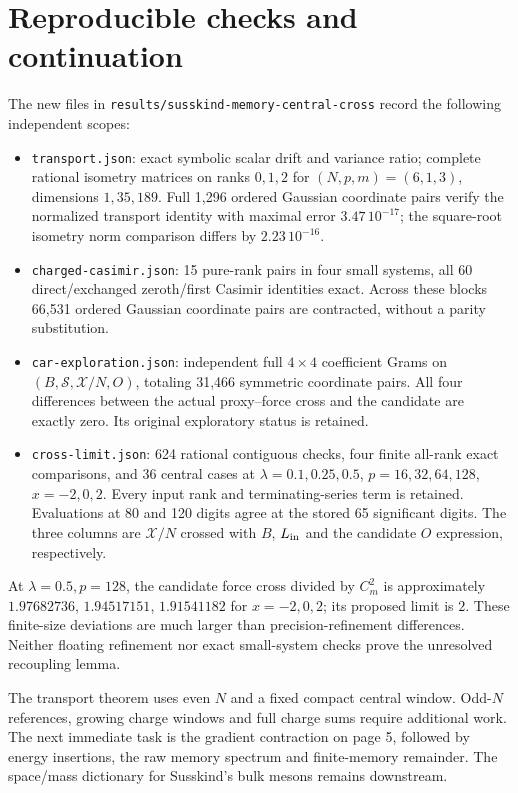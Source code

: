 \documentclass[11pt,a4paper]{article}
\begin{document}
\section{Reproducible checks and continuation}
The new files in \texttt{results/susskind-memory-central-cross}
record the following independent scopes:
\begin{itemize}
 \item \texttt{transport.json}: exact symbolic scalar drift and
 variance ratio; complete rational isometry matrices on ranks
 $0,1,2$ for $(N,p,m)=(6,1,3)$, dimensions $1,35,189$.
 Full 1,296 ordered Gaussian coordinate pairs verify the normalized
 transport identity with maximal error $3.47\,10^{-17}$; the
 square-root isometry norm comparison differs by $2.23\,10^{-16}$.
 \item \texttt{charged-casimir.json}: 15 pure-rank pairs in four
 small systems, all 60 direct/exchanged zeroth/first Casimir
 identities exact. Across these blocks 66,531 ordered Gaussian
 coordinate pairs are contracted, without a parity substitution.
 \item \texttt{car-exploration.json}: independent full $4\times4$
 coefficient Grams on $(B,\mathcal S,\mathcal X/N,O)$, totaling
 31,466 symmetric coordinate pairs. All four differences between
 the actual proxy--force cross and the candidate are exactly zero.
 Its original exploratory status is retained.
 \item \texttt{cross-limit.json}: 624 rational contiguous checks,
 four finite all-rank exact comparisons, and 36 central cases at
 $\lambda=0.1,0.25,0.5$, $p=16,32,64,128$, $x=-2,0,2$.
 Every input rank and terminating-series term is retained.
 Evaluations at 80 and 120 digits agree at the stored 65 significant
 digits. The three columns are $\mathcal X/N$ crossed with $B$,
 $L_{\rm in}$ and the candidate $O$ expression, respectively.
\end{itemize}
At $\lambda=0.5,p=128$, the candidate force cross divided by
$C_m^2$ is approximately $1.97682736$, $1.94517151$, $1.91541182$
for $x=-2,0,2$; its proposed limit is $2$. These finite-size
deviations are much larger than precision-refinement differences.
Neither floating refinement nor exact small-system checks prove
the unresolved recoupling lemma.

The transport theorem uses even $N$ and a fixed compact central
window. Odd-$N$ references, growing charge windows and full charge
sums require additional work. The next immediate task is the
gradient contraction on page 5, followed by energy insertions,
the raw memory spectrum and finite-memory remainder. The
space/mass dictionary for Susskind's bulk mesons remains downstream.
\end{document}
